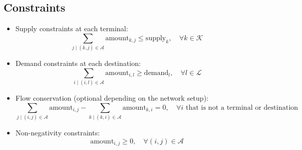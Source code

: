 \documentclass{article}
\begin{document}
\subsection*{Constraints}
\begin{itemize}
    \item Supply constraints at each terminal:
    \[
    \sum_{j \mid (k,j) \in \mathcal{A}} \text{amount}_{k,j} \leq \text{supply}_k, \quad \forall k \in \mathcal{K}
    \]
    \item Demand constraints at each destination:
    \[
    \sum_{i \mid (i,l) \in \mathcal{A}} \text{amount}_{i,l} \geq \text{demand}_l, \quad \forall l \in \mathcal{L}
    \]
    \item Flow conservation (optional depending on the network setup):
    \[
    \sum_{j \mid (i,j) \in \mathcal{A}} \text{amount}_{i,j} - \sum_{k \mid (k,i) \in \mathcal{A}} \text{amount}_{k,i} = 0, \quad \forall i \text{ that is not a terminal or destination}
    \]
    \item Non-negativity constraints:
    \[
    \text{amount}_{i,j} \geq 0, \quad \forall (i,j) \in \mathcal{A}
    \]
\end{itemize}
\end{document}

